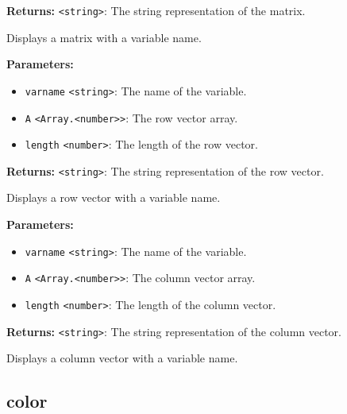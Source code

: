 \documentclass[12pt,a4paper]{article}
\begin{document}
\noindent \textbf{Returns:} \texttt{<string>}: The string representation of the matrix.

\noindent Displays a matrix with a variable name.

\vspace{5mm}
\noindent {}


\noindent \textbf{Parameters:}
\begin{itemize}
  \item \texttt{varname} \texttt{<string>}: The name of the variable.
  \item \texttt{A} \texttt{<Array.<number>>}: The row vector array.
  \item \texttt{length} \texttt{<number>}: The length of the row vector.
\end{itemize}

\noindent \textbf{Returns:} \texttt{<string>}: The string representation of the row vector.

\noindent Displays a row vector with a variable name.

\vspace{5mm}
\noindent {}


\noindent \textbf{Parameters:}
\begin{itemize}
  \item \texttt{varname} \texttt{<string>}: The name of the variable.
  \item \texttt{A} \texttt{<Array.<number>>}: The column vector array.
  \item \texttt{length} \texttt{<number>}: The length of the column vector.
\end{itemize}

\noindent \textbf{Returns:} \texttt{<string>}: The string representation of the column vector.

\noindent Displays a column vector with a variable name.


\subsection{color}
\vspace{5mm}
\noindent {}\vspace{4mm}
\end{document}
